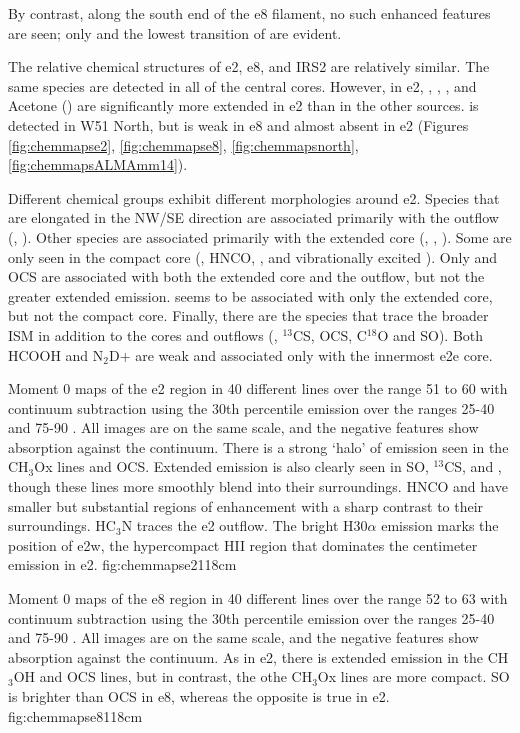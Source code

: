 \documentclass{aa}
\begin{document}
By contrast, along the south end of the e8 filament, no such enhanced features
are seen; only \formaldehyde and the lowest transition of \methanol are
evident.

The relative chemical structures of e2, e8, and IRS2 are relatively similar.
The same species are detected in all of the central cores.  However, in e2,
\dimethylether, \methylformate, \ethylcyanide, and Acetone (\acetone) are
significantly more extended in e2 than in the other sources.
\gaucheethanol is detected in W51 North, but is weak in e8 and almost absent
in e2 (Figures \ref{fig:chemmapse2}, \ref{fig:chemmapse8},
\ref{fig:chemmapsnorth}, \ref{fig:chemmapsALMAmm14}).

Different chemical groups exhibit different morphologies around e2.  Species that
are elongated in the NW/SE direction are associated primarily with the outflow
(\cyanoacetylene, \ethylcyanide).  Other species are associated primarily with
the extended core (\methylformate, \dimethylether, \acetone).  Some are only
seen in the compact core (\methyleneamidogen, HNCO, \formamide, and
vibrationally excited \cyanoacetylene).  Only \methanol and OCS are associated
with both the extended core and the outflow, but not the greater extended
emission.  \ketene seems to be associated with only the extended core, but not
the compact core. Finally, there are the species that trace the broader ISM in
addition to the cores and outflows (\formaldehyde, $^{13}$CS, OCS, C$^{18}$O
and SO).  Both HCOOH and N$_2$D+ are weak and associated only with the innermost
e2e core.

{Moment 0 maps of the e2 region in 40 different lines over the range 51 to 60
\kms with continuum subtraction using the 30th percentile emission
over the ranges 25-40 and 75-90 \kms.  All images are on the same scale, and
the negative features show absorption against the continuum.  There
is a strong `halo' of emission seen in the CH$_3$Ox lines and OCS.  Extended
emission is also clearly seen in SO, $^{13}$CS, and \formaldehyde, though these
lines more smoothly blend into their surroundings.  HNCO and \formamide have
smaller but substantial regions of enhancement with a sharp contrast to their
surroundings.  HC$_3$N traces the e2 outflow.  The bright H30$\alpha$ emission
marks the position of e2w, the hypercompact HII region that dominates the
centimeter emission in e2.
}{fig:chemmapse2}{1}{18cm}

{Moment 0 maps of the e8 region in 40 different lines over the range 52 to 63
\kms with continuum subtraction using the 30th percentile emission
over the ranges 25-40 and 75-90 \kms.  All images are on the same scale, and
the negative features show absorption against the continuum.  As in e2,
there is extended emission in the CH$_3$OH and OCS lines, but in contrast,
the othe CH$_3$Ox lines are more compact. SO is brighter than OCS in e8, 
whereas the opposite is true in e2.
}{fig:chemmapse8}{1}{18cm}
\end{document}
